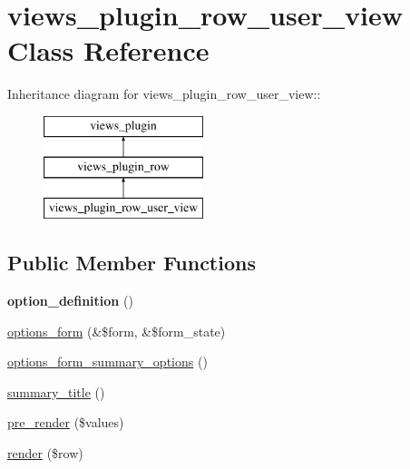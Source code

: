 \hypertarget{classviews__plugin__row__user__view}{
\section{views\_\-plugin\_\-row\_\-user\_\-view Class Reference}
\label{classviews__plugin__row__user__view}
}
Inheritance diagram for views\_\-plugin\_\-row\_\-user\_\-view::\begin{figure}[H]
\begin{center}
\leavevmode
\includegraphics[height=3cm]{classviews__plugin__row__user__view}
\end{center}
\end{figure}
\subsection*{Public Member Functions}
\begin{DoxyCompactItemize}
\item 
\hypertarget{classviews__plugin__row__user__view_a38181d64a28e1f977926fea16a430355}{
{\bfseries option\_\-definition} ()}
\label{classviews__plugin__row__user__view_a38181d64a28e1f977926fea16a430355}

\item 
\hyperlink{classviews__plugin__row__user__view_a3e0109e3008d06d56386d8aba10147c3}{options\_\-form} (\&\$form, \&\$form\_\-state)
\item 
\hyperlink{classviews__plugin__row__user__view_a13a199cb3edfcbbcf93be5d2169e11c1}{options\_\-form\_\-summary\_\-options} ()
\item 
\hyperlink{classviews__plugin__row__user__view_acc71621b782e383515aea48f1f0d8d9a}{summary\_\-title} ()
\item 
\hyperlink{classviews__plugin__row__user__view_a42d62630e62ef31aef94a88fccf173cb}{pre\_\-render} (\$values)
\item 
\hyperlink{classviews__plugin__row__user__view_a7d3b462a1d5f7cac2630fb42c8185407}{render} (\$row)
\end{DoxyCompactItemize}
